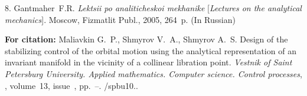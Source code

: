 {8. Gantmaher~F.\:R. \emph{Lektsii po analiticheskoi mekhanike}
[\emph{Lectures on the analytical mechanics}]. Moscow, Fizmatlit
Publ., 2005, 264~p. (In Russian)




\vskip 3mm

{\bf For citation:} Maliavkin G.~P., Shmyrov V.~A., Shmyrov A.~S.
Design of the stabilizing control of the orbital motion using the
analytical representation of an invariant manifold in the vicinity
of a collinear libration point. {\it Vestnik of Saint Petersburg
University. Applied mathematics. Computer science. Control
processes}, \issueyear, volume~13, issue~\issuenum,
pp.~\pageref{p10}--\pageref{p10e}.
\doivyp/spbu10.\issueyear.




}
